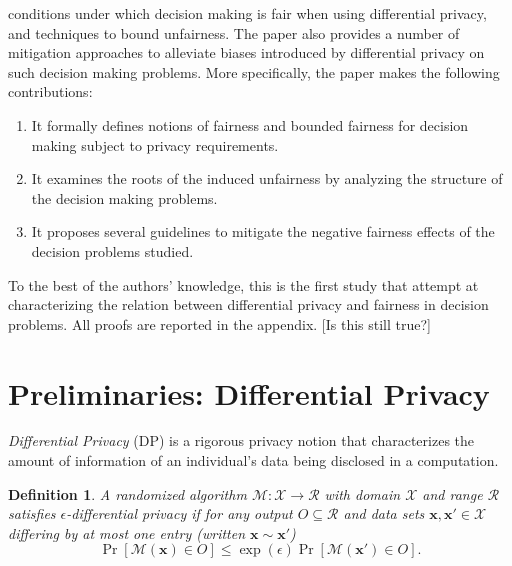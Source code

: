 \documentclass[9pt,lineno,twocolumn,twoside]{pnas-new}
\newtheorem{definition}{Definition}
\newcommand{\cM}{\mathcal{M}}
\newcommand{\cR}{\mathcal{R}}
\newcommand{\cX}{\mathcal{X}}
\begin{document}
    conditions under which decision making is fair when using differential
    privacy, and techniques to bound unfairness. The paper also provides a
    number of mitigation approaches to alleviate biases introduced by
    differential privacy on such decision making problems. More
    specifically, the paper makes the following contributions:
    \begin{enumerate}[leftmargin=*,labelsep=2pt,itemsep=0pt,parsep=2pt,topsep=2pt]

        \item It formally defines notions of fairness and bounded fairness for decision making
        subject to privacy requirements.

        \item It examines the roots of the induced unfairness by analyzing the structure
        of the decision making problems.

        \item It proposes several guidelines to mitigate the negative
        fairness effects of the decision problems studied.
    \end{enumerate}

    To the best of the authors' knowledge, this is the first study that
    attempt at characterizing the relation between differential privacy
    and fairness in decision problems. All proofs are reported in the
    appendix. [Is this still true?]


    \section*{Preliminaries: Differential Privacy}

    \emph{Differential Privacy} \cite{Dwork:06} (DP) is a rigorous privacy notion that characterizes the amount of information of an individual's data being disclosed in a computation.


    \begin{definition}%
        A randomized algorithm $\cM:\cX \to \cR$ with domain $\cX$ and range $\cR$ satisfies $\epsilon$-\emph{differential privacy} if
        for any output $O \subseteq \cR$ and data sets $\bm{x}, \bm{x}' \in \cX$ differing by at most one entry (written $\bm{x} \sim \bm{x}'$)
        \begin{equation}
            \label{eq:dp}
            \Pr[\cM(\bm{x}) \in O] \leq \exp(\epsilon) \Pr[\cM(\bm{x}') \in O].
        \end{equation}
    \end{definition}
\end{document}
